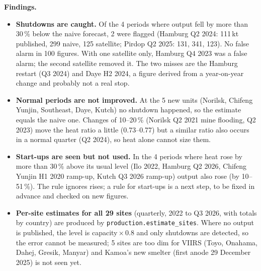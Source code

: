 \documentclass[10pt,a4paper]{article}
\newcommand{\code}[1]{\texttt{\small #1}}
\begin{document}
\textbf{Findings.}
\begin{itemize}[leftmargin=1.2em]
  \item \textbf{Shutdowns are caught.} Of the 4 periods where output fell by more than 30\,\% below the naive forecast, 2 were flagged (Hamburg Q2 2024: 111\,kt published, 299 naive, 125 satellite; Pirdop Q2 2025: 131, 341, 123). No false alarm in 100 figures. With one satellite only, Hamburg Q4 2023 was a false alarm; the second satellite removed it. The two misses are the Hamburg restart (Q3 2024) and Daye H2 2024, a figure derived from a year-on-year change and probably not a real stop.
  \item \textbf{Normal periods are not improved.} At the 5 new units (Norilsk, Chifeng Yunjin, Southeast, Daye, Kutch) no shutdown happened, so the estimate equals the naive one. Changes of 10--20\,\% (Norilsk Q2 2021 mine flooding, Q2 2023) move the heat ratio a little (0.73--0.77) but a similar ratio also occurs in a normal quarter (Q2 2024), so heat alone cannot size them.
  \item \textbf{Start-ups are seen but not used.} In the 4 periods where heat rose by more than 30\,\% above its usual level (Ilo 2022, Hamburg Q2 2026, Chifeng Yunjin H1 2020 ramp-up, Kutch Q3 2026 ramp-up) output also rose (by 10--51\,\%). The rule ignores rises; a rule for start-ups is a next step, to be fixed in advance and checked on new figures.
  \item \textbf{Per-site estimates for all 29 sites} (quarterly, 2022 to Q3 2026, with totals by country) are produced by \code{production.estimate\_sites}. Where no output is published, the level is capacity\,$\times$\,0.8 and only shutdowns are detected, so the error cannot be measured; 5 sites are too dim for VIIRS (Toyo, Onahama, Dahej, Gresik, Manyar) and Kamoa's new smelter (first anode 29 December 2025) is not seen yet.
\end{itemize}
\end{document}
